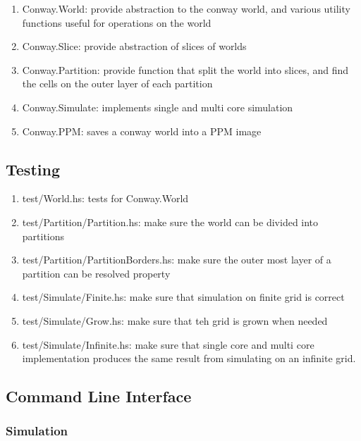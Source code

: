 \documentclass{article}
\newcommand{\code}[1]{{\ttfamily #1}}
\begin{document}
      \begin{enumerate}
        \item \code{Conway.World}: provide abstraction to the conway world,
        and various utility functions useful for operations on the world
        \item \code{Conway.Slice}: provide abstraction of slices of worlds
        \item \code{Conway.Partition}: provide function that split the world
        into slices, and find the cells on the outer layer of each partition
        \item \code{Conway.Simulate}: implements single and multi core
        simulation
        \item \code{Conway.PPM}: saves a conway world into a PPM image
      \end{enumerate}

    \subsection{Testing}

      \begin{enumerate}
        \item \code{test/World.hs}: tests for \code{Conway.World}
        \item \code{test/Partition/Partition.hs}: make sure the world can be
        divided into partitions
        \item \code{test/Partition/PartitionBorders.hs}: make sure the outer
        most layer of a partition can be resolved property
        \item \code{test/Simulate/Finite.hs}: make sure that simulation on
        finite grid is correct
        \item \code{test/Simulate/Grow.hs}: make sure that teh grid is grown
        when needed
        \item \code{test/Simulate/Infinite.hs}: make sure that single core
        and multi core implementation produces the same result from simulating
        on an infinite grid.
      \end{enumerate}

    \subsection{Command Line Interface}

      \subsubsection{Simulation}
\end{document}
